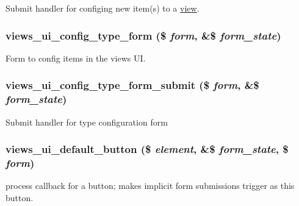 \label{admin_8inc_a421a319ebb088e20841e643f67ab1cfe}
Submit handler for configing new item(s) to a \hyperlink{classview}{view}. \hypertarget{admin_8inc_a72b3d556016a888d02199f15fa72a74d}{
\subsubsection[{views\_\-ui\_\-config\_\-type\_\-form}]{\setlength{\rightskip}{0pt plus 5cm}views\_\-ui\_\-config\_\-type\_\-form (\$ {\em form}, \/  \&\$ {\em form\_\-state})}}
\label{admin_8inc_a72b3d556016a888d02199f15fa72a74d}
Form to config items in the views UI. \hypertarget{admin_8inc_a61be3ab41a05febb0ec4c994beaf0b69}{
\subsubsection[{views\_\-ui\_\-config\_\-type\_\-form\_\-submit}]{\setlength{\rightskip}{0pt plus 5cm}views\_\-ui\_\-config\_\-type\_\-form\_\-submit (\$ {\em form}, \/  \&\$ {\em form\_\-state})}}
\label{admin_8inc_a61be3ab41a05febb0ec4c994beaf0b69}
Submit handler for type configuration form \hypertarget{admin_8inc_a712ec13f84195dec18693eebbdbc3f4c}{
\subsubsection[{views\_\-ui\_\-default\_\-button}]{\setlength{\rightskip}{0pt plus 5cm}views\_\-ui\_\-default\_\-button (\$ {\em element}, \/  \&\$ {\em form\_\-state}, \/  \$ {\em form})}}
\label{admin_8inc_a712ec13f84195dec18693eebbdbc3f4c}
process callback for a button; makes implicit form submissions trigger as this button.

